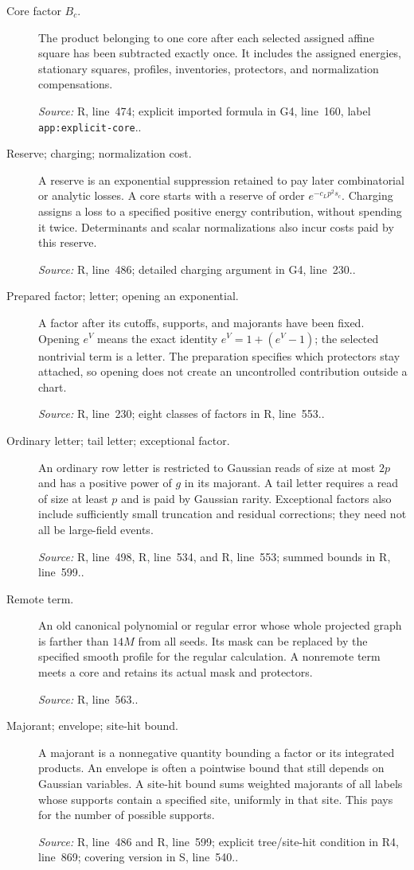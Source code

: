 \documentclass[11pt]{article}
\newcommand{\src}[2]{\textsf{#1}, line~#2}
\newcommand{\where}[1]{\par{\small\textit{Source:} #1.}}
\begin{document}
\begin{description}
\item[Core factor \(B_c\).]
The product belonging to one core after each selected assigned
affine square has been subtracted exactly once.  It includes the
assigned energies, stationary squares, profiles, inventories,
protectors, and normalization compensations.
\where{\src{R}{474}; explicit imported formula in \src{G4}{160},
label \texttt{app:explicit-core}.}

\item[Reserve; charging; normalization cost.]
A reserve is an exponential suppression retained to pay later
combinatorial or analytic losses.  A core starts with a reserve
of order \(e^{-c_Lp^2s_c}\).  Charging assigns a loss to a specified
positive energy contribution, without spending it twice.  Determinants
and scalar normalizations also incur costs paid by this reserve.
\where{\src{R}{486}; detailed charging argument in \src{G4}{230}.}

\item[Prepared factor; letter; opening an exponential.]
A factor after its cutoffs, supports, and majorants have been fixed.
Opening \(e^V\) means the exact identity
\(e^V=1+(e^V-1)\); the selected nontrivial term is a letter.
The preparation specifies which protectors stay attached, so opening
does not create an uncontrolled contribution outside a chart.
\where{\src{R}{230}; eight classes of factors in \src{R}{553}.}

\item[Ordinary letter; tail letter; exceptional factor.]
An ordinary row letter is restricted to Gaussian reads of size at
most \(2p\) and has a positive power of \(g\) in its majorant.
A tail letter requires a read of size at least \(p\) and is paid
by Gaussian rarity.  Exceptional factors also include sufficiently
small truncation and residual corrections; they need not all be
large-field events.
\where{\src{R}{498}, \src{R}{534}, and \src{R}{553};
summed bounds in \src{R}{599}.}

\item[Remote term.]
An old canonical polynomial or regular error whose whole projected
graph is farther than \(14M\) from all seeds.  Its mask can be
replaced by the specified smooth profile for the regular calculation.
A nonremote term meets a core and retains its actual mask and protectors.
\where{\src{R}{563}.}

\item[Majorant; envelope; site-hit bound.]
A majorant is a nonnegative quantity bounding a factor or its
integrated products.  An envelope is often a pointwise bound that
still depends on Gaussian variables.  A site-hit bound sums weighted
majorants of all labels whose supports contain a specified site,
uniformly in that site.  This pays for the number of possible supports.
\where{\src{R}{486} and \src{R}{599}; explicit tree/site-hit
condition in \src{R4}{869}; covering version in \src{S}{540}.}


\end{description}
\end{document}
